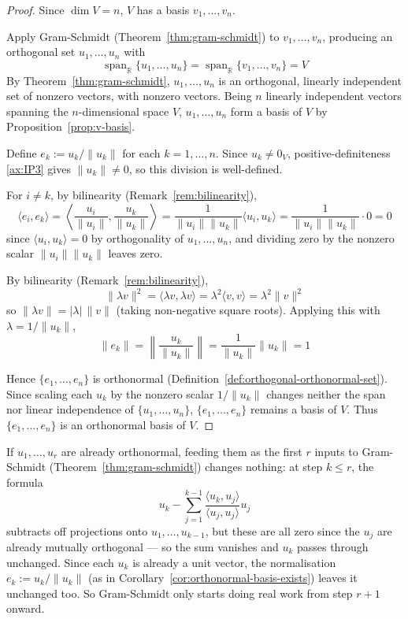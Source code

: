 		\begin{proof}
			Since $\dim V = n$, $V$ has a basis $v_1,\dots,v_n$.
			
			Apply Gram-Schmidt (Theorem~\ref{thm:gram-schmidt}) to $v_1,\dots,v_n$, producing an orthogonal set $u_1,\dots,u_n$ with
			\[
				\operatorname{span}_{\mathbb{R}}\{u_1,\dots,u_n\} = \operatorname{span}_{\mathbb{R}}\{v_1,\dots,v_n\} = V
			\]
			By Theorem~\ref{thm:gram-schmidt}, $u_1,\dots,u_n$ is an orthogonal, linearly independent set of nonzero vectors, with nonzero vectors. Being $n$ linearly independent vectors spanning the $n$-dimensional space $V$, $u_1,\dots,u_n$ form a basis of $V$ by Proposition~\ref{prop:v-basis}.
			
			Define $e_k := u_k / \|u_k\|$ for each $k=1,\dots,n$. Since $u_k \neq 0_V$, positive-definiteness \ref{ax:IP3} gives $\|u_k\| \neq 0$, so this division is well-defined.
			
			For $i \neq k$, by bilinearity (Remark~\ref{rem:bilinearity}),
			\[
				\langle e_i, e_k \rangle = \left\langle \frac{u_i}{\|u_i\|}, \frac{u_k}{\|u_k\|} \right\rangle = \frac{1}{\|u_i\|\|u_k\|}\langle u_i, u_k \rangle = \frac{1}{\|u_i\|\|u_k\|} \cdot 0 = 0
			\]
			since $\langle u_i, u_k\rangle = 0$ by orthogonality of $u_1,\dots,u_n$, and dividing zero by the nonzero scalar $\|u_i\|\|u_k\|$ leaves zero.
			
			By bilinearity (Remark~\ref{rem:bilinearity}),
			\[
				\|\lambda v\|^2 = \langle \lambda v, \lambda v \rangle = \lambda^2 \langle v,v \rangle = \lambda^2 \|v\|^2
			\]
			so $\|\lambda v\| = |\lambda| \, \|v\|$ (taking non-negative square roots). Applying this with $\lambda = 1/\|u_k\|$,
			\[
				\|e_k\| = \left\| \frac{u_k}{\|u_k\|} \right\| = \frac{1}{\|u_k\|}\|u_k\| = 1
			\]
			
			Hence $\{e_1,\dots,e_n\}$ is orthonormal (Definition~\ref{def:orthogonal-orthonormal-set}). Since scaling each $u_k$ by the nonzero scalar $1/\|u_k\|$ changes neither the span nor linear independence of $\{u_1,\dots,u_n\}$, $\{e_1,\dots,e_n\}$ remains a basis of $V$. Thus $\{e_1,\dots,e_n\}$ is an orthonormal basis of $V$.
		\end{proof}
		
		\begin{remark}
			\label{rem:gram-schmidt-fixes-orthonormal}
			If $u_1,\dots,u_r$ are already orthonormal, feeding them as the first $r$ inputs to Gram-Schmidt (Theorem~\ref{thm:gram-schmidt}) changes nothing: at step $k \le r$, the formula
			\[
				u_k - \sum_{j=1}^{k-1} \frac{\langle u_k, u_j \rangle}{\langle u_j, u_j \rangle} u_j
			\]
			subtracts off projections onto $u_1,\dots,u_{k-1}$, but these are all zero since the $u_j$ are already mutually orthogonal — so the sum vanishes and $u_k$ passes through unchanged. Since each $u_k$ is already a unit vector, the normalisation $e_k := u_k/\|u_k\|$ (as in Corollary~\ref{cor:orthonormal-basis-exists}) leaves it unchanged too. So Gram-Schmidt only starts doing real work from step $r+1$ onward.
		\end{remark}
		
